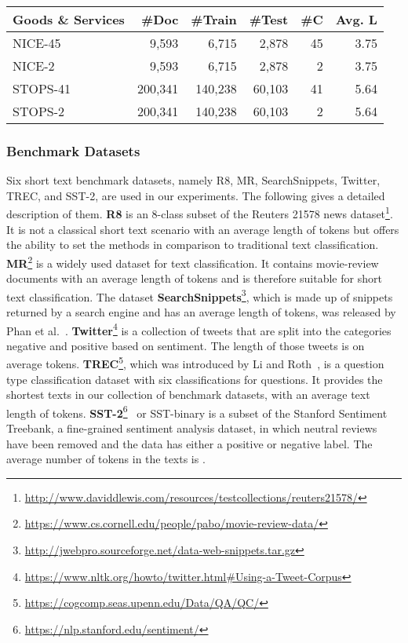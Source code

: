 \documentclass[runningheads]{llncs}
\begin{document}
\begin{table}[ht]
\begin{tabular}{l|rrrrr}
            \toprule
            \textbf{Goods \& Services}           & \textbf{\#Doc} & \textbf{\#Train} & \textbf{\#Test} & \textbf{\#C} & \textbf{Avg. L} \\
            \midrule
            NICE-45                              & 9,593          & 6,715            & 2,878           & 45                 & 3.75                 \\
            NICE-2                               & 9,593          & 6,715            & 2,878           & 2                  & 3.75                 \\
            STOPS-41                             & 200,341        & 140,238          & 60,103          & 41                 & 5.64                 \\
            STOPS-2                              & 200,341        & 140,238          & 60,103          & 2                  & 5.64                 \\
            \bottomrule
        \end{tabular}
    \end{table}

\subsubsection{Benchmark Datasets}
Six short text benchmark datasets, namely R8, MR, SearchSnippets, Twitter, TREC, and SST-2, are used in our experiments. The following gives a detailed description of them.
\textbf{R8} is an 8-class subset of the Reuters 21578 news dataset\footnote{\url{http://www.daviddlewis.com/resources/testcollections/reuters21578/}}. It is not a classical short text scenario with an average length of  tokens but offers the ability to set the methods in comparison to traditional text classification.
\textbf{MR}\footnote{\url{https://www.cs.cornell.edu/people/pabo/movie-review-data/}} is a widely used dataset for text classification. It contains movie-review documents with an average length of  tokens and is therefore suitable for short text classification.
The dataset \textbf{SearchSnippets}\footnote{\url{http://jwebpro.sourceforge.net/data-web-snippets.tar.gz}}, which is made up of snippets returned by a search engine and has an average length of  tokens, was released by Phan et al.~\cite{phan2008learning}.
\textbf{Twitter}\footnote{\url{https://www.nltk.org/howto/twitter.html\#Using-a-Tweet-Corpus}} is a collection of  tweets that are split into the categories negative and positive based on sentiment. The length of those tweets is on average  tokens.
\textbf{TREC}\footnote{\url{https://cogcomp.seas.upenn.edu/Data/QA/QC/}}, which was introduced by Li and Roth~\cite{li-roth-2002-learning}, is a question type classification dataset with six classifications for questions. It provides the shortest texts in our collection of benchmark datasets, with an average text length of  tokens.
\textbf{SST-2}\footnote{\url{https://nlp.stanford.edu/sentiment/}}~\cite{SocherEtAl2013:RNTN} or SST-binary is a subset of the Stanford Sentiment Treebank, a fine-grained sentiment analysis dataset, in which neutral reviews have been removed and the data has either a positive or negative label. 
    The average number of tokens in the texts is .
\end{document}
